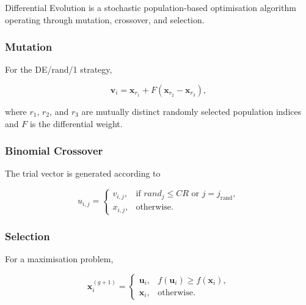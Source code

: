 \documentclass[review]{elsarticle}
\begin{document}
Differential Evolution is a stochastic population-based optimisation
algorithm operating through mutation, crossover, and selection.


\subsubsection{Mutation}

For the DE/rand/1 strategy,

\begin{equation}
\mathbf{v}_{i}
=
\mathbf{x}_{r_1}
+
F
\left(
\mathbf{x}_{r_2}
-
\mathbf{x}_{r_3}
\right),
\end{equation}

where $r_1$, $r_2$, and $r_3$ are mutually distinct randomly selected
population indices and $F$ is the differential weight.


\subsubsection{Binomial Crossover}

The trial vector is generated according to

\begin{equation}
u_{i,j}
=
\begin{cases}
v_{i,j},
& \text{if } rand_j \leq CR
\text{ or } j=j_{\mathrm{rand}}, \\

x_{i,j},
& \text{otherwise}.
\end{cases}
\end{equation}


\subsubsection{Selection}

For a maximisation problem,

\begin{equation}
\mathbf{x}_{i}^{(g+1)}
=
\begin{cases}
\mathbf{u}_{i},
& f(\mathbf{u}_{i}) \geq f(\mathbf{x}_{i}),\\

\mathbf{x}_{i},
& \text{otherwise}.
\end{cases}
\end{equation}



\end{document}
